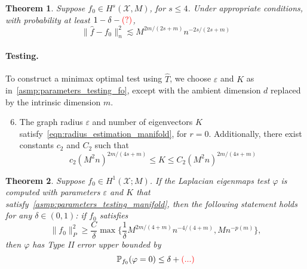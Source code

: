 \documentclass{article}
\newcommand{\1}{\mathbf{1}}
\newcommand{\mc}[1]{\mathcal{#1}}
\newcommand{\Pbb}{\mathbb{P}}
\newcommand{\wh}[1]{\widehat{#1}}
\theoremstyle{alden}
\theoremstyle{aldenthm}
\newtheorem{theorem}{Theorem}
\theoremstyle{definition}
\theoremstyle{remark}
\begin{document}
\begin{theorem}
	\label{thm:laplacian_eigenmaps_estimation_manifold}
	Suppose $f_0 \in H^s(\mc{X},M)$, for $s \leq 4$. Under appropriate conditions, with probability at least $1 - \delta - \textcolor{red}{(?)}$,
	\begin{equation}
	\label{eqn:laplacian_eigenmaps_estimation_manifold}
	\|\wh{f} - f_0\|_n^2 \lesssim M^{2m/(2s + m)}n^{-2s/(2s + m)}
	\end{equation}
\end{theorem}

\paragraph{Testing.}
To construct a minimax optimal test using $\wh{T}$, we choose $\varepsilon$ and $K$ as in~\ref{asmp:parameters_testing_fo}, except with the ambient dimension $d$ replaced by the intrinsic dimension $m$.
\begin{enumerate}[label=(A\arabic*)]
	\setcounter{enumi}{5}
	\item 
	\label{asmp:parameters_testing_manifold}
	The graph radius $\varepsilon$ and number of eigenvectors $K$ satisfy~\eqref{eqn:radius_estimation_manifold}, for $r = 0$. Additionally, there exist constants $c_2$ and $C_2$ such that
	\begin{equation*}
	c_2 (M^2n)^{2m/(4s + m)} \leq K \leq C_2 (M^2n)^{2m/(4s + m)}
	\end{equation*}
\end{enumerate}

\begin{theorem}
	\label{thm:laplacian_eigenmaps_testing_manifold}
	Suppose $f_0 \in H^1(\mc{X};M)$. If the Laplacian eigenmaps test $\varphi$ is computed with parameters $\varepsilon$ and $K$ that satisfy~\ref{asmp:parameters_testing_manifold}, then the following statement holds for any $\delta \in (0,1)$: if $f_0$ satisfies
	\begin{equation}
	\label{eqn:laplacian_eigenmaps_testing_criticalradius_manifold}
	\|f_0\|_P^2 \geq \frac{C}{\delta} \max\biggl\{\frac{1}{\delta}M^{2m/(4 + m)}n^{-4/(4 + m)}, M n^{-p(m)}\biggr\},
	\end{equation}
	then $\varphi$ has Type II error upper bounded by 
	\begin{equation}
	\Pbb_{f_0}(\varphi = 0) \leq \delta + \textcolor{red}{(...)}
	\end{equation}
\end{theorem}
\end{document}
